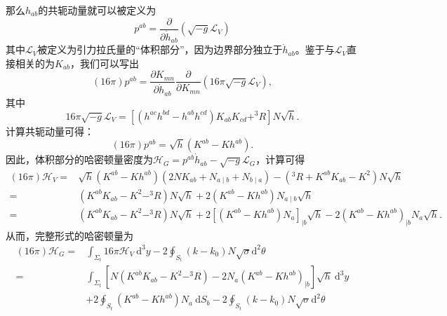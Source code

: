 \documentclass[hyperref, UTF8, a4paper]{ctexart}
\begin{document}
那么$h_{ab}$的共轭动量就可以被定义为
\begin{equation*}
	p^{ab} =\frac{\partial }{\partial \dot{h}_{ab}}\left(\sqrt{-g}\mathcal{L}_{V}\right)
\end{equation*}
其中$\mathcal{L}_{V}$被定义为引力拉氏量的“体积部分”，因为边界部分独立于$\dot{h}_{ab}$。鉴于与$\mathcal{L}_{V}$直接相关的为$K_{ab}$，我们可以写出
\begin{equation*}
	(16\pi )p^{ab} =\frac{\partial K_{mn}}{\partial \dot{h}_{ab}}\frac{\partial }{\partial K_{mn}}\left( 16\pi \sqrt{-g}\mathcal{L}_{V}\right) ,
\end{equation*}
其中
\begin{equation*}
	16\pi \sqrt{-g}\mathcal{L}_{V} =\left[\left( h^{ac} h^{bd} -h^{ab} h^{cd}\right) K_{ab} K_{cd} +^{3} R\right] N\sqrt{h} .
\end{equation*}
计算共轭动量可得：
\begin{equation*}
	( 16\pi ) p^{ab} =\sqrt{h} (K^{ab} -Kh^{ab} ).
\end{equation*}
因此，体积部分的哈密顿量密度为$\mathcal{H}_{G} =p^{ab}\dot{h}_{ab} -\sqrt{-g}\mathcal{L}_{G}$，计算可得
\begin{equation*}
	\begin{aligned}
		(16\pi )\mathcal{H}_{V} = & \sqrt{h}\left( K^{ab} -Kh^{ab}\right)( 2NK_{ab} +N_{a\mid b} +N_{b\mid a}) -(^{3} R+K^{ab} K_{ab} -K^{2} )N\sqrt{h}\\
		= & \left( K^{ab} K_{ab} -K^{2} -^{3} R\right) N\sqrt{h} +2\left( K^{ab} -Kh^{ab}\right) N_{a\mid b}\sqrt{h}\\
		= & \left( K^{ab} K_{ab} -K^{2} -^{3} R\right) N\sqrt{h} +2\left[\left( K^{ab} -Kh^{ab}\right) N_{a}\right]_{\mid b}\sqrt{h} -2(K^{ab} -Kh^{ab} )_{\mid b} N_{a}\sqrt{h} .
	\end{aligned}
\end{equation*}
从而，完整形式的哈密顿量为
\begin{equation*}
	\begin{aligned}
		(16\pi )\mathcal{H}_{G} = & \int _{\Sigma _{t}} 16\pi \mathcal{H}_{V} \ \mathrm{d}^{3} y-2\oint _{S_{t}}( k-k_{0}) N\sqrt{\sigma }\mathrm{d}^{2} \theta \\
		= & \int _{\Sigma _{t}}\left[ N\left( K^{ab} K_{ab} -K^{2} -^{3} R\right) -2N_{a}\left( K^{ab} -Kh^{ab}\right)_{\mid b}\right]\sqrt{h} \ \mathrm{d}^{3} y\\
		& +2\oint _{S_{t}}\left( K^{ab} -Kh^{ab}\right) N_{a} \ \mathrm{d} S_{b} -2\oint _{S_{t}}( k-k_{0}) N\sqrt{\sigma }\mathrm{d}^{2} \theta 
	\end{aligned}
\end{equation*}
\end{document}
